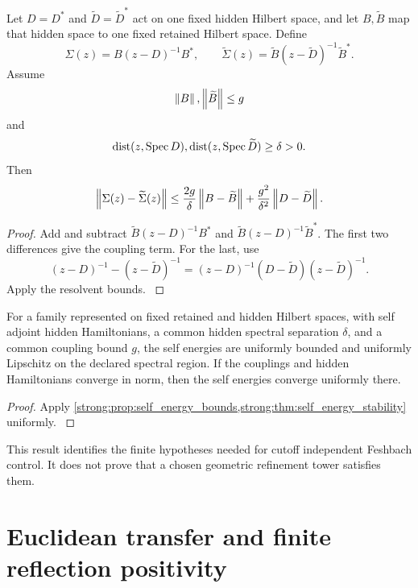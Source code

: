 \begin{theorem}\label{strong:theorem:035}\label{strong:thm:self_energy_stability}
Let \(D=D^*\) and \(\widetilde D=\widetilde D^*\) act on one fixed hidden Hilbert space, and let \(B,\widetilde B\) map that hidden space to one fixed retained Hilbert space. Define
\[
\Sigma(z)=B(z-D)^{-1}B^*,
\qquad
\widetilde\Sigma(z)=\widetilde B(z-\widetilde D)^{-1}\widetilde B^*.
\]
Assume
\[
\left\lVert B\right\rVert,\left\lVert\widetilde B\right\rVert\leq g
\]
and
\[
\operatorname{dist}(z,\operatorname{Spec} D),
\operatorname{dist}(z,\operatorname{Spec}\widetilde D)
\geq\delta>0.
\]
Then
\[
\left\lVert\Sigma(z)-\widetilde\Sigma(z)\right\rVert
\leq
\frac{2g}{\delta}\left\lVert B-\widetilde B\right\rVert
+
\frac{g^2}{\delta^2}\left\lVert D-\widetilde D\right\rVert.
\]
\end{theorem}

\begin{proof}\label{strong:proof:054}
Add and subtract \(\widetilde B(z-D)^{-1}B^*\) and \(\widetilde B(z-D)^{-1}\widetilde B^*\). The first two differences give the coupling term. For the last, use
\[
(z-D)^{-1}-(z-\widetilde D)^{-1}
=(z-D)^{-1}(D-\widetilde D)(z-\widetilde D)^{-1}.
\]
Apply the resolvent bounds.
\label{strong:proof:054:end}\end{proof}

\begin{corollary}\label{strong:corollary:013}\label{strong:cor:uniform_feshbach}
For a family represented on fixed retained and hidden Hilbert spaces, with self adjoint hidden Hamiltonians, a common hidden spectral separation \(\delta\), and a common coupling bound \(g\), the self energies are uniformly bounded and uniformly Lipschitz on the declared spectral region. If the couplings and hidden Hamiltonians converge in norm, then the self energies converge uniformly there.
\end{corollary}

\begin{proof}\label{strong:proof:055}
Apply \cref{strong:prop:self_energy_bounds,strong:thm:self_energy_stability} uniformly.
\label{strong:proof:055:end}\end{proof}

This result identifies the finite hypotheses needed for cutoff independent Feshbach control. It does not prove that a chosen geometric refinement tower satisfies them.

\section{Euclidean transfer and finite reflection positivity}\label{strong:section:010}\label{strong:sec:euclidean}

